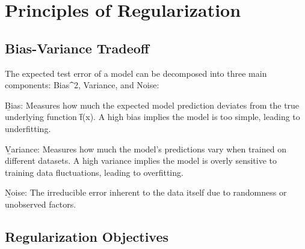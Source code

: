 \section{Principles of Regularization}



\subsection{Bias-Variance Tradeoff}
The expected test error of a model can be decomposed into three main components: Bias\f{^2}, Variance, and Noise:

\b{Bias}: Measures how much the expected model prediction deviates from the true underlying function \f{f(x)}. A high bias implies the model is too simple, leading to underfitting.

\b{Variance}: Measures how much the model's predictions vary when trained on different datasets. A high variance implies the model is overly sensitive to training data fluctuations, leading to overfitting.

\b{Noise}: The irreducible error inherent to the data itself due to randomness or unobserved factors.
\vfill
\begin{figure}[h!]
    \centering
    \begin{subfigure}{.45\textwidth}
        \centering
    \end{subfigure}
    \begin{subfigure}{.45\textwidth}
        \centering
    \end{subfigure}
\end{figure}
\vfill



\subsection{Regularization Objectives}



